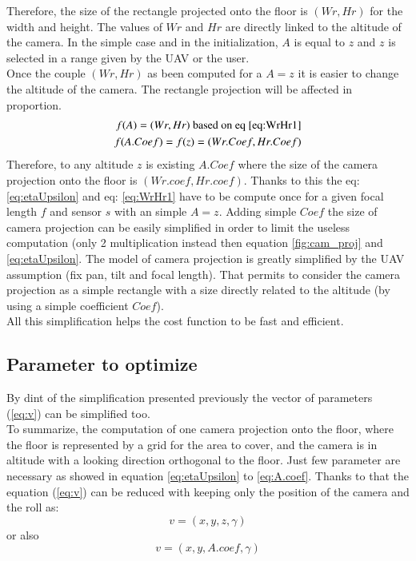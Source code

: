 Therefore, the size of the rectangle projected onto the floor is $(Wr,Hr)$ for the width and height. The values of $Wr$ and $Hr$ are directly linked to the altitude of the camera. In the simple case and in the initialization, $A$ is equal to $z$  and $z$ is selected in a range given by the UAV or the user. \\
Once the couple $(Wr,Hr)$ as been computed for a $A=z$ it is easier to change the altitude of the camera. The rectangle projection will be affected in proportion.
	\begin{equation}\label{eq:A.coef}
		\begin{split}
 		   	f(A)= (Wr,Hr) \text{ based on eq \ref{eq:WrHr1}}\\
    		f(A.Coef)=f(z)= (Wr.Coef,Hr.Coef)      
    	 \end{split} 
	\end{equation}
Therefore, to any altitude $z$ is existing $A.Coef$ where the size of the camera projection onto the floor is $(Wr.coef, Hr.coef)$. Thanks to this the eq: \ref{eq:etaUpsilon} and eq: \ref{eq:WrHr1} have to be compute once  for a given focal length $f$ and sensor $s$ with an simple $A=z$. Adding simple $Coef$ the size of camera projection can be easily simplified in order to limit the useless computation (only 2 multiplication instead then equation \ref{fig:cam_proj} and \ref{eq:etaUpsilon}.
The model of camera projection is greatly simplified by the UAV assumption (fix pan, tilt and focal length). That permits to consider the camera projection as a simple rectangle with a size directly related to the altitude (by using a simple coefficient $Coef$).\\
All this simplification helps the cost function to be fast and efficient. \\

\subsection{Parameter to optimize }\label{sec:parameterToOptimize}
By dint of the simplification presented previously the vector of parameters (\ref{eq:v}) can be simplified too.\\
To summarize,  the computation of one camera projection onto the floor, where the floor is represented by a grid for the area to cover, and the camera is in altitude with a looking direction orthogonal to the floor. Just few parameter are necessary  as showed in equation  \ref{eq:etaUpsilon} %
to \ref{eq:A.coef}. Thanks to that the equation (\ref{eq:v}) can be reduced with keeping only the position of the camera and the roll as:
	\begin{equation}\label{eq:v2}
		v=(x,y,z,\gamma )
	\end{equation}
	or also
	\begin{equation}\label{eq:v2}
		v=(x,y,A.coef,\gamma )
	\end{equation}

